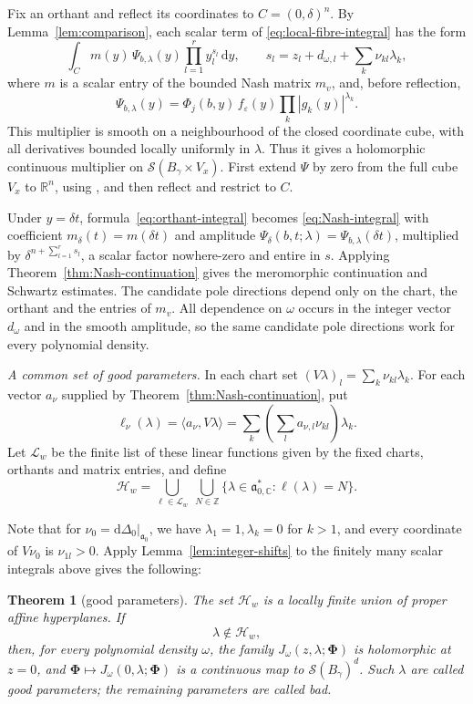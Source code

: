 \documentclass[a4paper,12pt]{amsart}
\numberwithin{equation}{section}
\newtheorem{theorem}{Theorem}[section]
\theoremstyle{definition}
\theoremstyle{remark}
\newcommand{\R}{\mathbb R}
\newcommand{\C}{\mathbb C}
\newcommand{\fa}{\mathfrak a}
\newcommand{\mcS}{\mathcal S}
\newcommand{\mcH}{\mathcal H}
\newcommand{\dd}{\mathrm d}
\begin{document}
Fix an orthant and reflect its coordinates to $C=(0,\delta)^n$. By Lemma~\ref{lem:comparison}, each scalar term of \eqref{eq:local-fibre-integral} has the form
\begin{equation}\label{eq:orthant-integral}
 \int_C m(y)\,\Psi_{b,\lambda}(y)\prod_{l=1}^r y_l^{s_l}\,\dd y,
 \qquad s_l=z_l+d_{\omega,l}+\sum_k\nu_{kl}\lambda_k,
\end{equation}
where $m$ is a scalar entry of the bounded Nash matrix $m_v$, and, before reflection,
\[
 \Psi_{b,\lambda}(y)=\Phi_j(b,y)\,f_\varepsilon(y)
                           \prod_k|g_k(y)|^{\lambda_k}.
\]
This multiplier is smooth on a neighbourhood of the closed coordinate cube, with all derivatives bounded locally uniformly in $\lambda$. Thus it gives a holomorphic continuous multiplier on $\mcS(B_\gamma\times V_x)$. First extend $\Psi$ by zero from the full cube $V_x$ to $\R^n$, using \cite[Theorem~5.4.1]{AG08}, and then reflect and restrict to $C$.

Under $y=\delta t$, formula~\eqref{eq:orthant-integral} becomes \eqref{eq:Nash-integral} with coefficient $m_\delta(t)=m(\delta t)$ and amplitude $\Psi_\delta(b,t;\lambda)=\Psi_{b,\lambda}(\delta t)$, multiplied by $\delta^{n+\sum_{l=1}^r s_l}$, a scalar factor nowhere-zero and entire in $s$. Applying Theorem~\ref{thm:Nash-continuation} gives the meromorphic continuation and Schwartz estimates. The candidate pole directions depend only on the chart, the orthant and the entries of $m_v$. All dependence on $\omega$ occurs in the integer vector $d_\omega$ and in the smooth amplitude, so the same candidate pole directions work for every polynomial density.

\emph{A common set of good parameters.}
In each chart set $(V\lambda)_l=\sum_k\nu_{kl}\lambda_k$. For each vector $a_\nu$ supplied by Theorem~\ref{thm:Nash-continuation}, put
\[
 \ell_\nu(\lambda)=\langle a_\nu,V\lambda\rangle
 =\sum_k\left(\sum_l a_{\nu,l}\nu_{kl}\right)\lambda_k.
\]
Let $\mathcal L_w$ be the finite list of these linear functions given by the fixed charts, orthants and matrix entries, and define
\[
 \mcH_w=\bigcup_{\ell\in\mathcal L_w}\ \bigcup_{N\in\mathbb Z}
                      \{\lambda\in\fa_{0,\C}^*:\ell(\lambda)=N\}.
\]

Note that for $\nu_0=\dd\Delta_0|_{\fa_0}$, we have $\lambda_1=1,\lambda_k=0$ for $k>1$, and every coordinate of $V\nu_0$ is $\nu_{1l}>0$. Apply Lemma~\ref{lem:integer-shifts} to the finitely many scalar integrals above gives the following:

\begin{theorem}[good parameters]\label{thm:good-parameters}
The set $\mcH_w$ is a locally finite union of proper affine hyperplanes. If
\begin{equation}\label{eq:good-parameter}
 \lambda\notin\mcH_w,
\end{equation}
then, for every polynomial density $\omega$, the family $J_\omega(z,\lambda;\boldsymbol\Phi)$ is holomorphic at $z=0$, and $\boldsymbol\Phi\mapsto J_\omega(0,\lambda;\boldsymbol\Phi)$ is a continuous map to $\mcS(B_\gamma)^d$. Such $\lambda$ are called \emph{good parameters}; the remaining parameters are called \emph{bad}.
\end{theorem}
\end{document}
